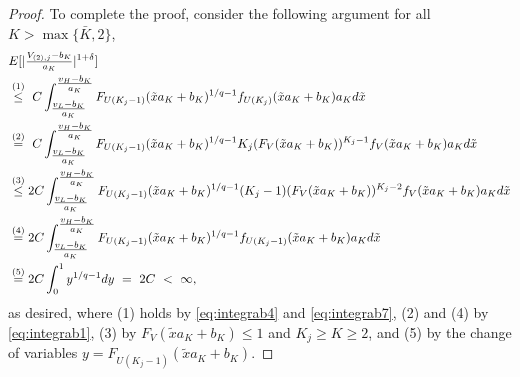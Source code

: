 \begin{proof}
To complete the proof, consider the following argument for all $K>\max\{\bar{K},2\}$,
\begin{align*}
&E[ \vert \tfrac{V_{(2),j}-b_{K}}{a_{K}}\vert ^{1+\delta } ] \notag\\
&\overset{(1)}{\leq }~C\int_{\tfrac{v_{L}-b_{K}}{a_{K}}}^{\tfrac{ v_{H}-b_{K}}{a_{K}}}F_{U(K_{j}-1)}( \tilde{x} a_{K}+b_{K}) ^{1/q-1}f_{U(K_{j})}( \tilde{x} a_{K}+b_{K}) a_{K}d\tilde{x} \\
&\overset{(2)}{=}~C\int_{\tfrac{v_{L}-b_{K}}{a_{K}}}^{\tfrac{v_{H}-b_{K}}{a_{K}}}F_{U(K_{j}-1)}( \tilde{x}a_{K}+b_{K})^{1/q-1}K_{j}( F_{V}(\tilde{x}a_{K}+b_{K})) ^{K_{j}-1}f_{V}( \tilde{x}a_{K}+b_{K}) a_{K}d\tilde{x} \\
&\overset{(3)}{\leq }2C\int_{\tfrac{v_{L}-b_{K}}{a_{K}}}^{\tfrac{v_{H}-b_{K}}{ a_{K}}}F_{U(K_{j}-1)}( \tilde{x}a_{K}+b_{K}) ^{1/q-1}( K_{j}-1) ( F_{V}(\tilde{x}a_{K}+b_{K})) ^{K_{j}-2}f_{V}( \tilde{x}a_{K}+b_{K}) a_{K}d\tilde{x} \\
&\overset{(4)}{=}2C\int_{\tfrac{v_{L}-b_{K}}{a_{K}}}^{\tfrac{v_{H}-b_{K}}{ a_{K}}}F_{U(K_{j}-1)}( \tilde{x}a_{K}+b_{K}) ^{1/q-1}f_{U(K_{j}-1)}( \tilde{x}a_{K}+b_{K}) a_{K}d\tilde{x} \\
&\overset{(5)}{=}2C\int_{0}^{1}y^{1/q-1}dy ~=~2C ~<~ \infty,
\end{align*}
as desired, where (1) holds by \eqref{eq:integrab4} and \eqref{eq:integrab7}, (2) and (4) by \eqref{eq:integrab1}, (3) by $F_{V}(\tilde{x}a_{K}+b_{K})\leq 1$ and $K_{j}\geq K \geq 2$, and (5) by the change of variables $y=F_{U(K_{j}-1)}( \tilde{x}a_{K}+b_{K}) $.
\end{proof}

